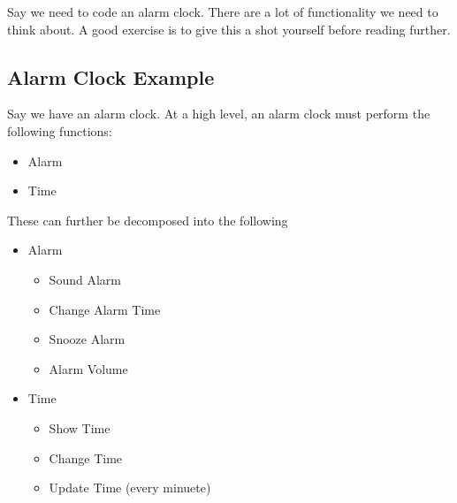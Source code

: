\documentclass[12pt,a4paper]{book}
\begin{document}
			Say we need to code an alarm clock. There are a lot of functionality we need to think about. A good exercise is to give this a shot yourself before reading further. 

			\subsection{Alarm Clock Example}
				Say we have an alarm clock. At a high level, an alarm clock must perform the following functions:
				\begin{itemize}
					\item Alarm
					\item Time
				\end{itemize}

				These can further be decomposed into the following
				
				\begin{itemize}
					\item Alarm 
						\begin{itemize}
							\item Sound Alarm
							\item Change Alarm Time
							\item Snooze Alarm
							\item Alarm Volume
						\end{itemize}
					\item Time
						\begin{itemize}
							\item Show Time
							\item Change Time
							\item Update Time (every minuete)
						\end{itemize}
				\end{itemize}
\end{document}
